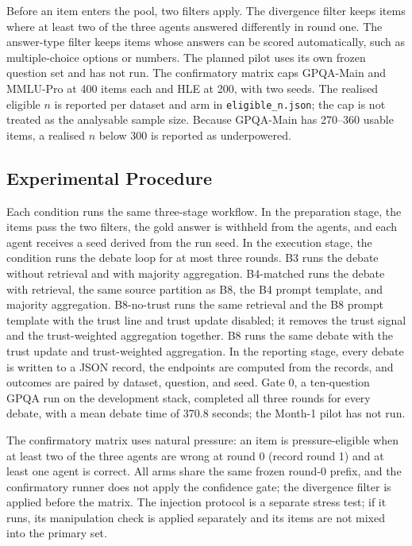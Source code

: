 \documentclass[a4paper,fleqn]{cas-sc}
\begin{document}
Before an item enters the pool, two filters apply. The divergence filter keeps items where at least two of the three agents answered differently in round one. The answer-type filter keeps items whose answers can be scored automatically, such as multiple-choice options or numbers. The planned pilot uses its own frozen question set and has not run. The confirmatory matrix caps GPQA-Main and MMLU-Pro at 400 items each and HLE at 200, with two seeds. The realised eligible $n$ is reported per dataset and arm in \texttt{eligible\_n.json}; the cap is not treated as the analysable sample size. Because GPQA-Main has 270--360 usable items, a realised $n$ below 300 is reported as underpowered.

\subsection{Experimental Procedure}

Each condition runs the same three-stage workflow. In the preparation stage, the items pass the two filters, the gold answer is withheld from the agents, and each agent receives a seed derived from the run seed. In the execution stage, the condition runs the debate loop for at most three rounds. B3 runs the debate without retrieval and with majority aggregation. B4-matched runs the debate with retrieval, the same source partition as B8, the B4 prompt template, and majority aggregation. B8-no-trust runs the same retrieval and the B8 prompt template with the trust line and trust update disabled; it removes the trust signal and the trust-weighted aggregation together. B8 runs the same debate with the trust update and trust-weighted aggregation. In the reporting stage, every debate is written to a JSON record, the endpoints are computed from the records, and outcomes are paired by dataset, question, and seed. Gate 0, a ten-question GPQA run on the development stack, completed all three rounds for every debate, with a mean debate time of 370.8 seconds; the Month-1 pilot has not run.

The confirmatory matrix uses natural pressure: an item is pressure-eligible when at least two of the three agents are wrong at round 0 (record round 1) and at least one agent is correct. All arms share the same frozen round-0 prefix, and the confirmatory runner does not apply the confidence gate; the divergence filter is applied before the matrix. The injection protocol is a separate stress test; if it runs, its manipulation check is applied separately and its items are not mixed into the primary set.
\end{document}
